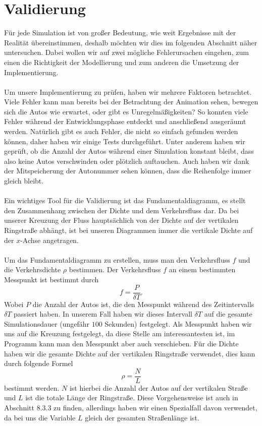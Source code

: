 \chapter{Validierung}\label{chap4}

Für jede Simulation ist von großer Bedeutung, wie weit Ergebnisse mit der Realität übereinstimmen, deshalb möchten wir dies im folgenden Abschnitt näher untersuchen. Dabei wollen wir auf zwei mögliche Fehlerursachen eingehen, zum einen die Richtigkeit der Modellierung und zum anderen die Umsetzung der Implementierung. 
\\ \\
Um unsere Implementierung zu prüfen, haben wir mehrere Faktoren betrachtet. Viele Fehler kann man bereits bei der Betrachtung der Animation sehen, bewegen sich die Autos wie erwartet, oder gibt es Unregelmäßigkeiten? So konnten viele Fehler während der Entwicklungsphase entdeckt und anschließend ausgeräumt werden. Natürlich gibt es auch Fehler, die nicht so einfach gefunden werden können, daher haben wir einige Tests durchgeführt. Unter anderem haben wir geprüft, ob die Anzahl der Autos während einer Simulation konstant bleibt, dass also keine Autos verschwinden oder plötzlich auftauchen. Auch haben wir dank der Mitspeicherung der Autonummer sehen können, dass die Reihenfolge immer gleich bleibt. 
\\ \\ 
Ein wichtiges Tool für die Validierung ist das Fundamentaldiagramm, es stellt den Zusammenhang zwischen der Dichte und dem Verkehrsfluss dar. Da bei unserer Kreuzung der Fluss hauptsächlich von der Dichte auf der vertikalen Ringstraße abhängt, ist bei unseren Diagrammen immer die vertikale Dichte auf der $x$-Achse angetragen. 
\\ \\
Um das Fundamentaldiagramm zu erstellen, muss man den Verkehrsfluss $f$ und die Verkehrsdichte $\rho$ bestimmen. Der Verkehrsfluss $f$ an einem bestimmten Messpunkt ist bestimmt durch
\[ f = \frac{P}{\delta T}. \]
Wobei $P$ die Anzahl der Autos ist, die den Messpunkt während des Zeitintervalls $\delta T$ passiert haben. In unserem Fall haben wir dieses Intervall $\delta T$ auf die gesamte Simulationsdauer (ungefähr $100$ Sekunden) festgelegt. Als Messpunkt haben wir uns auf die Kreuzung festgelegt, da diese Stelle am interessantesten ist, im Programm kann man den Messpunkt aber auch verschieben. Für die Dichte haben wir die gesamte Dichte auf der vertikalen Ringstraße verwendet, dies kann durch folgende Formel
\[ \rho = \frac{N}{L} \]
bestimmt werden. $N$ ist hierbei die Anzahl der Autos auf der vertikalen Straße und $L$ ist die totale Länge der Ringstraße. Diese Vorgehensweise ist auch in \cite{book:bungartz} Abschnitt 8.3.3 zu finden, allerdings haben wir einen Spezialfall davon verwendet, da bei uns die Variable $L$ gleich der gesamten Straßenlänge ist.

